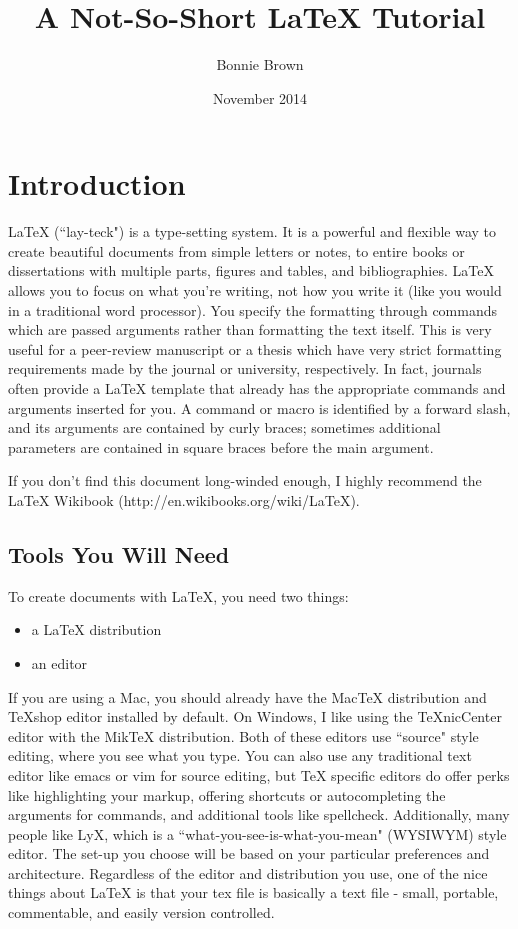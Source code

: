 \documentclass[12pt]{article}
\title{A Not-So-Short LaTeX Tutorial}
\author{Bonnie Brown}
\date{November 2014}
\begin{document}
\maketitle

\section{Introduction}
LaTeX (``lay-teck") is a type-setting system. It is a powerful and flexible way to create beautiful documents from simple letters or notes, to entire books or dissertations with multiple parts, figures and tables, and bibliographies. LaTeX allows you to focus on what you're writing, not how you write it (like you would in a traditional word processor). You specify the formatting through commands which are passed arguments rather than formatting the text itself. This is very useful for a peer-review manuscript or a thesis which have very strict formatting requirements made by the journal or university, respectively. In fact, journals often provide a LaTeX template that already has the appropriate commands and arguments inserted for you. A command or macro is identified by a forward slash, and its arguments are contained by curly braces; sometimes additional parameters are contained in square braces before the main argument.

If you don't find this document long-winded enough, I highly recommend the LaTeX Wikibook (http://en.wikibooks.org/wiki/LaTeX).

\subsection{Tools You Will Need}
To create documents with LaTeX, you need two things:
\begin{itemize}
\item{a LaTeX distribution}
\item{an editor}
\end{itemize}
If you are using a Mac, you should already have the MacTeX distribution and TeXshop editor installed by default. On Windows, I like using the TeXnicCenter editor with the MikTeX distribution. Both of these editors use ``source" style editing, where you see what you type. You can also use any traditional text editor like emacs or vim for source editing, but TeX specific editors do offer perks like highlighting your markup, offering shortcuts or autocompleting the arguments for commands, and additional tools like spellcheck. Additionally, many people like LyX, which is a ``what-you-see-is-what-you-mean" (WYSIWYM) style editor. The set-up you choose will be based on your particular preferences and architecture. Regardless of the editor and distribution you use, one of the nice things about LaTeX is that your tex file is basically a text file - small, portable, commentable, and easily version controlled.
\end{document}
